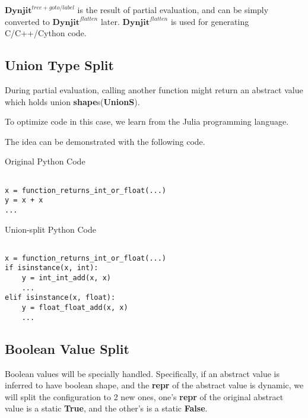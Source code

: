 \documentclass[conference]{IEEEtran}
\begin{document}
$\mathbf{Dynjit}^{tree+goto/label}$ is the result of partial evaluation,
and can be simply converted to $\mathbf{Dynjit}^{flatten}$ later.
$\mathbf{Dynjit}^{flatten}$ is used for generating C/C++/Cython code.


\subsection{Union Type Split}

During partial evaluation, calling another function might return an abstract value which holds
union \textbf{shape}s(\textbf{UnionS}).

To optimize code in this case, we learn from the Julia programming language.

The idea can be demonstrated with the following code.

\newpage

\begin{center}
Original Python Code
\end{center}

\lstset{language=Python, showlines=true, mathescape=true}
\begin{lstlisting}

x = function_returns_int_or_float(...)
y = x + x
...

\end{lstlisting}

\begin{center}
Union-split Python Code
\end{center}


\lstset{language=Python, showlines=true, mathescape=true}
\begin{lstlisting}

x = function_returns_int_or_float(...)
if isinstance(x, int):
    y = int_int_add(x, x)
    ...
elif isinstance(x, float):
    y = float_float_add(x, x)
    ...

\end{lstlisting}



\subsection{Boolean Value Split}

Boolean values will be specially handled. Specifically,
if an abstract value is inferred to have boolean shape,
and the \textbf{repr} of the abstract value is dynamic,
we will split the configuration to 2 new ones,
one's \textbf{repr} of the original abstract value is a static \textbf{True},
and the other's is a static \textbf{False}.
\end{document}
